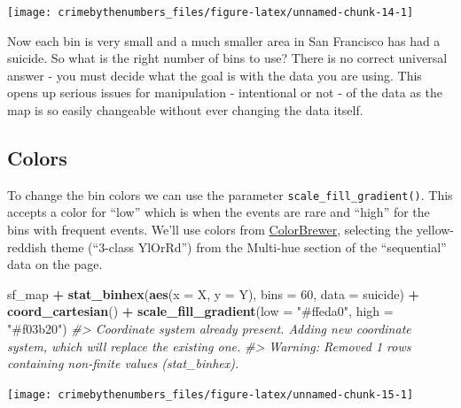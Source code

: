 \documentclass[
  12pt,
]{book}
\newenvironment{Shaded}{\begin{snugshade}}{\end{snugshade}}
\newcommand{\CommentTok}[1]{\textcolor[rgb]{0.37,0.37,0.37}{\textit{#1}}}
\newcommand{\DataTypeTok}[1]{\textcolor[rgb]{0.27,0.27,0.27}{#1}}
\newcommand{\DecValTok}[1]{\textcolor[rgb]{0.06,0.06,0.06}{#1}}
\newcommand{\KeywordTok}[1]{\textcolor[rgb]{0.27,0.27,0.27}{\textbf{#1}}}
\newcommand{\NormalTok}[1]{#1}
\newcommand{\OperatorTok}[1]{\textcolor[rgb]{0.43,0.43,0.43}{\textbf{#1}}}
\newcommand{\StringTok}[1]{\textcolor[rgb]{0.5,0.5,0.5}{#1}}
\begin{document}
\begin{center}\texttt{[image: crimebythenumbers\_files/figure-latex/unnamed-chunk-14-1]} \end{center}

Now each bin is very small and a much smaller area in San Francisco has had a suicide. So what is the right number of bins to use? There is no correct universal answer - you must decide what the goal is with the data you are using. This opens up serious issues for manipulation - intentional or not - of the data as the map is so easily changeable without ever changing the data itself.

\hypertarget{colors}{%
\subsection{Colors}\label{colors}}

To change the bin colors we can use the parameter \texttt{scale\_fill\_gradient()}. This accepts a color for ``low'' which is when the events are rare and ``high'' for the bins with frequent events. We'll use colors from \href{http://colorbrewer2.org}{ColorBrewer}, selecting the yellow-reddish theme (``3-class YlOrRd'') from the Multi-hue section of the ``sequential'' data on the page.

\begin{Shaded}
\begin{Highlighting}[]
\NormalTok{sf\_map }\OperatorTok{+}
\StringTok{  }\KeywordTok{stat\_binhex}\NormalTok{(}\KeywordTok{aes}\NormalTok{(}\DataTypeTok{x =}\NormalTok{ X, }\DataTypeTok{y =}\NormalTok{ Y),}
              \DataTypeTok{bins  =} \DecValTok{60}\NormalTok{,}
              \DataTypeTok{data =}\NormalTok{ suicide) }\OperatorTok{+}
\StringTok{  }\KeywordTok{coord\_cartesian}\NormalTok{() }\OperatorTok{+}
\StringTok{  }\KeywordTok{scale\_fill\_gradient}\NormalTok{(}\DataTypeTok{low =} \StringTok{"\#ffeda0"}\NormalTok{,}
                      \DataTypeTok{high =} \StringTok{"\#f03b20"}\NormalTok{)}
\CommentTok{\#> Coordinate system already present. Adding new coordinate system, which will replace the existing one.}
\CommentTok{\#> Warning: Removed 1 rows containing non{-}finite values (stat\_binhex).}
\end{Highlighting}
\end{Shaded}

\begin{center}\texttt{[image: crimebythenumbers\_files/figure-latex/unnamed-chunk-15-1]} \end{center}
\end{document}
